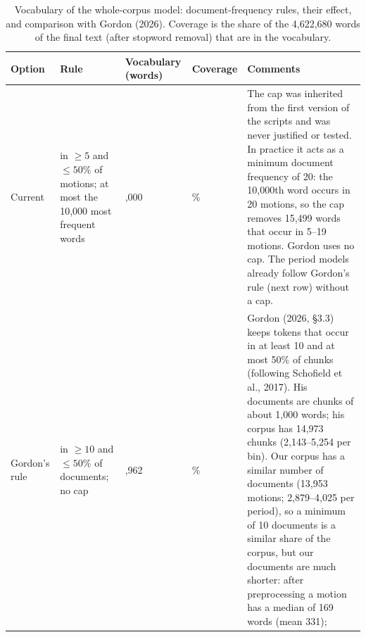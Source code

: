 
\begin{landscape}
\begin{table}[p]
\centering
\small
\renewcommand{\arraystretch}{1.3}
\caption{Vocabulary of the whole-corpus model: document-frequency rules, their effect, and comparison with Gordon (2026).
Coverage is the share of the 4,622,680 words of the final text (after stopword removal) that are in the vocabulary.}
\label{tab:whole-corpus-vocabulary}
\begin{tabularx}{\linewidth}{@{}>{\raggedright\arraybackslash}p{3.2cm}
                              >{\raggedright\arraybackslash}p{3.6cm}
                              >{\raggedleft\arraybackslash}p{1.9cm}
                              >{\raggedleft\arraybackslash}p{1.5cm}
                              >{\raggedright\arraybackslash}X@{}}
\toprule
Option & Rule & Vocabulary (words) & Coverage & Comments \\
\midrule
Current &
  in $\geq 5$ and $\leq 50\%$ of motions; at most the 10,000 most frequent words &
  10,000 & 85.7\% &
  The cap was inherited from the first version of the scripts and was never justified or tested. In practice it acts as a
  minimum document frequency of 20: the 10,000th word occurs in 20 motions, so the cap removes 15,499 words that occur in
  5--19 motions. Gordon uses no cap. The period models already follow Gordon's rule (next row) without a cap. \\
\addlinespace
Gordon's rule &
  in $\geq 10$ and $\leq 50\%$ of documents; no cap &
  15,962 & 87.8\% &
  Gordon (2026, \S3.3) keeps tokens that occur in at least 10 and at most 50\% of chunks (following Schofield et al., 2017).
  His documents are chunks of about 1,000 words; his corpus has 14,973 chunks (2,143--5,254 per bin). Our corpus has a
  similar number of documents (13,953 motions; 2,879--4,025 per period), so a minimum of 10 documents is a similar share of
  the corpus, but our documents are much shorter: after preprocessing a motion has a median of 169 words (mean 331);

\end{tabularx}
\end{table}
\end{landscape}
